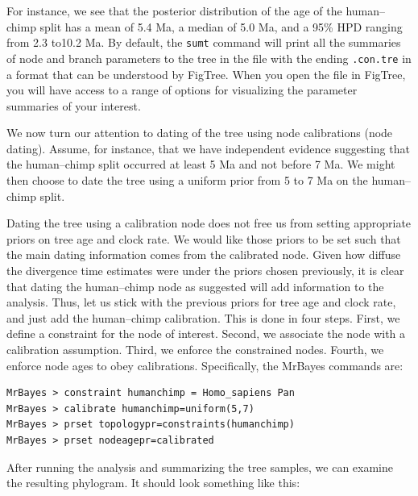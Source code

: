 \documentclass[12pt]{book}
\newcommand{\ttt}[1]{\texttt{#1} }
\begin{document}
For instance, we see that the posterior distribution of the age of the human--chimp split has a
mean of 5.4 Ma, a median of 5.0 Ma, and a 95\% HPD ranging from 2.3 to10.2 Ma. By default, the
\ttt{sumt} command will print all the summaries of node and branch parameters to the tree in the
file with the ending \ttt{.con.tre} in a format that can be understood by FigTree. When you open
the file in FigTree, you will have access to a range of options for visualizing the parameter
summaries of your interest.

We now turn our attention to dating of the tree using node calibrations (node dating). Assume, for
instance, that we have independent evidence suggesting that the human--chimp split occurred at
least 5 Ma and not before 7 Ma.  We might then choose to date the tree using a uniform prior from 5
to 7 Ma on the human--chimp split.

Dating the tree using a calibration node does not free us from setting appropriate priors on tree
age and clock rate. We would like those priors to be set such that the main dating information
comes from the calibrated node. Given how diffuse the divergence time estimates were under the
priors chosen previously, it is clear that dating the human--chimp node as suggested will add
information to the analysis. Thus, let us stick with the previous priors for tree age and clock
rate, and just add the human--chimp calibration. This is done in four steps. First, we define a
constraint for the node of interest. Second, we associate the node with a calibration assumption.
Third, we enforce the constrained nodes. Fourth, we enforce node ages to obey calibrations.
Specifically, the MrBayes commands are:

\begin{singlespacing}
\begin{verbatim}
MrBayes > constraint humanchimp = Homo_sapiens Pan
MrBayes > calibrate humanchimp=uniform(5,7)
MrBayes > prset topologypr=constraints(humanchimp)
MrBayes > prset nodeagepr=calibrated
\end{verbatim}
\end{singlespacing}

After running the analysis and summarizing the tree samples, we can examine the resulting
phylogram.  It should look something like this:
\end{document}
